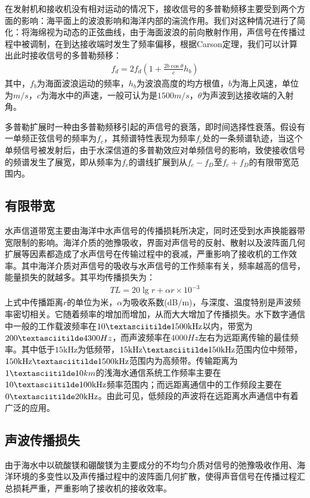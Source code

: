 在发射机和接收机没有相对运动的情况下，接收信号的多普勒频移主要受到两个方面的影响：海平面上的波浪影响和海洋内部的湍流作用。我们对这种情况进行了简化：将海绵视为动态的正弦曲线，由于海面波浪的前向散射作用，声信号在传播过程中被调制，在到达接收端时发生了频率偏移，根据Carson定理，我们可以计算出此时接收信号的多普勒频移：
\begin{eqnarray}
    f_d=2f_d\left(1+\frac{2b\cos\theta}{c}h_b\right)
    \label{equ:2.5}
\end{eqnarray}
其中，$f_b$为海面波浪运动的频率，$h_b$为波浪高度的均方根值，$b$为海上风速，单位为$m/s$，$c$为海水中的声速，一般可认为是$1500m/s$，$\theta$为声波到达接收端的入射角。

多普勒扩展时一种由多普勒频移引起的声信号的衰落，即时间选择性衰落。假设有一单频正弦信号的频率为$f_c$，其频谱特性表现为频率$f_c$处的一条频谱轨迹，当这个单频信号被发射后，由于水深信道的多普勒效应对单频信号的影响，致使接收信号的频谱发生了展宽，即从频率为$f_c$的谱线扩展到从$f_c-f_D$至$f_c+f_D$的有限带宽范围内。
\subsection{有限带宽}
水声信道带宽主要由海洋中水声信号的传播损耗所决定，同时还受到水声换能器带宽限制的影响。海洋介质的弛豫吸收\citep{Essebbar1994}，界面对声信号的反射、散射以及波阵面几何扩展等因素都造成了水声信号在传输过程中的衰减，严重影响了接收机的工作效率。其中海洋介质对声信号的吸收与水声信号的工作频率有关，频率越高的信号，能量损失的就越多。其平均传播损失为：
\begin{eqnarray}
    TL=20\lg r+\alpha r\times10^{-3}
    \label{equ:2.6}
\end{eqnarray}
上式中传播距离$r$的单位为米，$\alpha$为吸收系数(dB/m)，与深度、温度特别是声波频率密切相关。它随着频率的增加而增加，从而大大增加了传播损失。水下数字通信中一般的工作载波频率在$10\textasciitilde
1500\mbox{kHz}$以内，带宽为$200\textasciitilde
4300Hz$，而声波频率在$4000Hz$左右为远距离传输的最佳频率。其中低于$15\mbox{kHz}$为低频带，$15\mbox{kHz}\textasciitilde
150\mbox{kHz}$范围内位中频带，$150\mbox{kHz}\textasciitilde
1500\mbox{kHz}$范围内为高频带。传输距离为$1\textasciitilde10km$的浅海水通信系统工作频率主要在$10\textasciitilde
100\mbox{kHz}$频率范围内；而远距离通信中的工作频段主要在$0\textasciitilde
20\mbox{kHz}$。由此可见，低频段的声波将在远距离水声通信中有着广泛的应用。
\subsection{声波传播损失}
由于海水中以硫酸镁和硼酸镁为主要成分的不均匀介质对信号的弛豫吸收作用、海洋环境的多变性以及声传播过程中的波阵面几何扩散，使得声音信号在传播过程汇总损耗严重，严重影响了接收机的接收效率。

